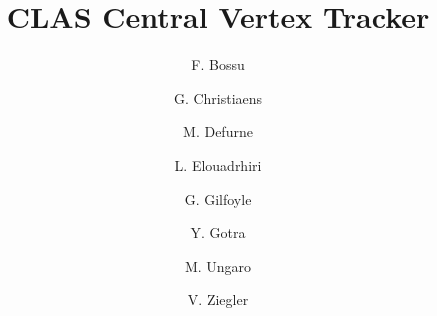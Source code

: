 \title{CLAS Central Vertex Tracker}

\author[A]{F. Bossu}
\author[A]{G. Christiaens}
\author[A]{M. Defurne}
\author[B]{L. Elouadrhiri}
\author[C]{G. Gilfoyle}
\author[B]{Y. Gotra}
\author[B]{M. Ungaro}
\author[B]{V. Ziegler}

\address[A]{CEA-Saclay - Gif-sur-Yvette, France}
\address[B]{Thomas Jefferson National Accelerator Facility, Newport News, VA, USA}
\address[C]{University of Richmond, Richmond, VA, USA}

